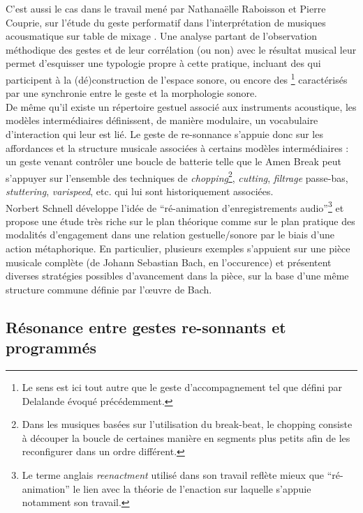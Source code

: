 \indent C'est aussi le cas dans le travail mené par Nathanaëlle Raboisson et Pierre Couprie, sur l'étude du geste performatif dans l'interprétation de musiques acousmatique sur table de mixage \cite{raboisson_experience_2017}. Une analyse partant de l'observation méthodique des gestes et de leur corrélation (ou non) avec le résultat musical leur permet d'esquisser une typologie propre à cette pratique, incluant des  qui participent à la (dé)construction de l'espace sonore, ou encore des \footnote{Le sens est ici tout autre que le geste d'accompagnement tel que défini par Delalande évoqué précédemment.} caractérisés par une synchronie entre le geste et la morphologie sonore.\\
\indent De même qu'il existe un répertoire gestuel associé aux instruments acoustique, les modèles intermédiaires définissent, de manière modulaire, un vocabulaire d'interaction qui leur est lié. Le geste de re-sonnance s'appuie donc sur les affordances et la structure musicale associées à certains modèles intermédiaires : un geste venant contrôler une boucle de batterie telle que le Amen Break peut s'appuyer sur l'ensemble des techniques de \textit{chopping}\footnote{Dans les musiques basées sur l'utilisation du break-beat, le chopping consiste à découper la boucle de certaines manière en segments plus petits afin de les reconfigurer dans un ordre différent.}, \textit{cutting}, \textit{filtrage} passe-bas, \textit{stuttering}, \textit{varispeed}, etc. qui lui sont historiquement associées.\\
\indent Norbert Schnell développe l'idée de ``ré-animation d'enregistrements audio''\footnote{Le terme anglais \textit{reenactment} utilisé dans son travail reflète mieux que ``ré-animation'' le lien avec la théorie de l'enaction sur laquelle s'appuie notamment son travail.} \cite{schnell_playing_2013} et propose une étude très riche sur le plan théorique comme sur le plan pratique des modalités d'engagement dans une relation gestuelle/sonore par le biais d'une action métaphorique. En particulier, plusieurs exemples s'appuient sur une pièce musicale complète (de Johann Sebastian Bach, en l'occurence) et présentent diverses stratégies possibles d'avancement dans la pièce, sur la base d'une même structure commune définie par l'œuvre de Bach.


\subsection{Résonance entre gestes re-sonnants et programmés}

